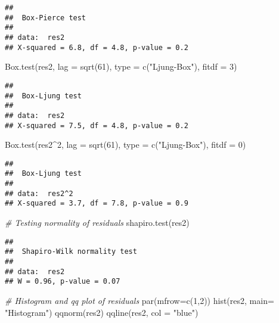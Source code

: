 \documentclass[
]{article}
\newenvironment{Shaded}{\begin{snugshade}}{\end{snugshade}}
\newcommand{\AttributeTok}[1]{\textcolor[rgb]{0.77,0.63,0.00}{#1}}
\newcommand{\CommentTok}[1]{\textcolor[rgb]{0.56,0.35,0.01}{\textit{#1}}}
\newcommand{\DecValTok}[1]{\textcolor[rgb]{0.00,0.00,0.81}{#1}}
\newcommand{\FunctionTok}[1]{\textcolor[rgb]{0.00,0.00,0.00}{#1}}
\newcommand{\NormalTok}[1]{#1}
\newcommand{\SpecialCharTok}[1]{\textcolor[rgb]{0.00,0.00,0.00}{#1}}
\newcommand{\StringTok}[1]{\textcolor[rgb]{0.31,0.60,0.02}{#1}}
\begin{document}
\begin{verbatim}
## 
##  Box-Pierce test
## 
## data:  res2
## X-squared = 6.8, df = 4.8, p-value = 0.2
\end{verbatim}

\begin{Shaded}
\begin{Highlighting}[]
\FunctionTok{Box.test}\NormalTok{(res2, }\AttributeTok{lag =} \FunctionTok{sqrt}\NormalTok{(}\DecValTok{61}\NormalTok{), }\AttributeTok{type =} \FunctionTok{c}\NormalTok{(}\StringTok{"Ljung{-}Box"}\NormalTok{), }\AttributeTok{fitdf =} \DecValTok{3}\NormalTok{)}
\end{Highlighting}
\end{Shaded}

\begin{verbatim}
## 
##  Box-Ljung test
## 
## data:  res2
## X-squared = 7.5, df = 4.8, p-value = 0.2
\end{verbatim}

\begin{Shaded}
\begin{Highlighting}[]
\FunctionTok{Box.test}\NormalTok{(res2}\SpecialCharTok{\^{}}\DecValTok{2}\NormalTok{, }\AttributeTok{lag =} \FunctionTok{sqrt}\NormalTok{(}\DecValTok{61}\NormalTok{), }\AttributeTok{type =} \FunctionTok{c}\NormalTok{(}\StringTok{"Ljung{-}Box"}\NormalTok{), }\AttributeTok{fitdf =} \DecValTok{0}\NormalTok{)}
\end{Highlighting}
\end{Shaded}

\begin{verbatim}
## 
##  Box-Ljung test
## 
## data:  res2^2
## X-squared = 3.7, df = 7.8, p-value = 0.9
\end{verbatim}

\begin{Shaded}
\begin{Highlighting}[]
\CommentTok{\# Testing normality of residuals}
\FunctionTok{shapiro.test}\NormalTok{(res2)}
\end{Highlighting}
\end{Shaded}

\begin{verbatim}
## 
##  Shapiro-Wilk normality test
## 
## data:  res2
## W = 0.96, p-value = 0.07
\end{verbatim}

\begin{Shaded}
\begin{Highlighting}[]
\CommentTok{\# Histogram and qq plot of residuals}
\FunctionTok{par}\NormalTok{(}\AttributeTok{mfrow=}\FunctionTok{c}\NormalTok{(}\DecValTok{1}\NormalTok{,}\DecValTok{2}\NormalTok{))}
\FunctionTok{hist}\NormalTok{(res2, }\AttributeTok{main=} \StringTok{"Histogram"}\NormalTok{)}
\FunctionTok{qqnorm}\NormalTok{(res2)}
\FunctionTok{qqline}\NormalTok{(res2, }\AttributeTok{col =} \StringTok{"blue"}\NormalTok{)}
\end{Highlighting}
\end{Shaded}
\end{document}
